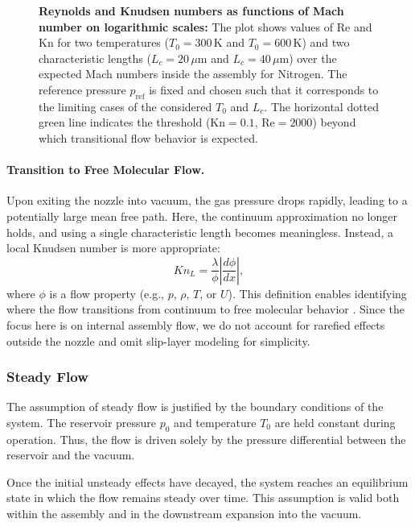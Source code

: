 	\begin{figure}[H]
		\centering
		
		\caption[Reynolds and Knudsen numbers as functions of Mach number on logarithmic scales.]{
			\textbf{Reynolds and Knudsen numbers as functions of Mach number on logarithmic scales:}
			The plot shows values of $\mathrm{Re}$ and $\mathrm{Kn}$ for two temperatures ($T_0 = 300\,\mathrm{K}$ and $T_0 = 600\,\mathrm{K}$) and two characteristic lengths ($L_c = 20\,\mu\mathrm{m}$ and $L_c = 40\,\mu\mathrm{m}$) over the expected Mach numbers inside the assembly for Nitrogen.
			The reference pressure $p_\mathrm{ref}$ is fixed and chosen such that it corresponds to the limiting cases of the considered $T_0$ and $L_c$.
			The horizontal dotted green line indicates the threshold ($\mathrm{Kn} = 0.1$, $\mathrm{Re} = 2000$) beyond which transitional flow behavior is expected.
		}
		\label{fig:knudsen-reynolds-plot}
	\end{figure}

	\paragraph{Transition to Free Molecular Flow.}
		Upon exiting the nozzle into vacuum, the gas pressure drops rapidly, leading to a potentially large mean free path.
		Here, the continuum approximation no longer holds, and using a single characteristic length becomes meaningless.
		Instead, a local Knudsen number is more appropriate:
		\begin{equation}
		  Kn_L
		  = \frac{\lambda}{\phi}\left|\frac{d\phi}{dx}\right|,
		\end{equation}
		where \(\phi\) is a flow property (e.g., \(p\), \(\rho\), \(T\), or \(U\)).
		This definition enables identifying where the flow transitions from continuum to free molecular behavior \cite{bird_dsmc_2013,Grabe2008,LiLam1964}.
		Since the focus here is on internal assembly flow, we do not account for rarefied effects outside the nozzle and omit slip-layer modeling for simplicity.

\subsubsection*{Steady Flow}
	The assumption of steady flow is justified by the boundary conditions of the system.
	The reservoir pressure $p_0$ and temperature $T_0$ are held constant during operation.
	Thus, the flow is driven solely by the pressure differential between the reservoir and the vacuum.

	Once the initial unsteady effects have decayed, the system reaches an equilibrium state in which the flow remains steady over time.
	This assumption is valid both within the assembly and in the downstream expansion into the vacuum.
	\cite{LiLam1964}
